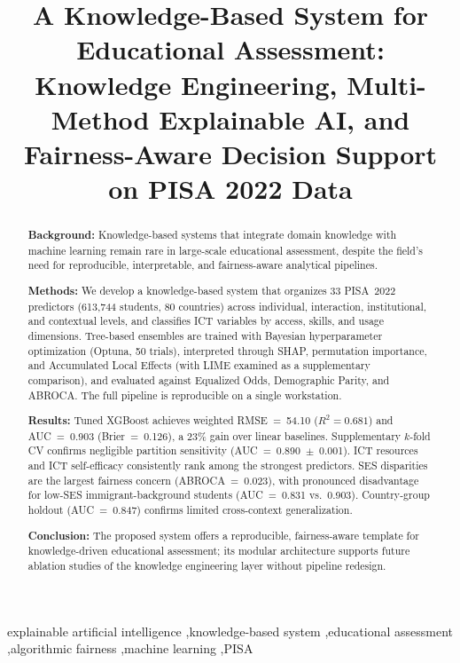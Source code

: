 \documentclass[review,12pt]{elsarticle}
\begin{document}
\begin{frontmatter}

\title{A Knowledge-Based System for Educational Assessment: Knowledge Engineering, Multi-Method Explainable AI, and Fairness-Aware Decision Support on PISA 2022 Data}

\author[aff1]{}
\ead{}
\address[aff1]{}

\begin{abstract}
\setlength{\rightskip}{0pt plus 20pt}

\textbf{Background:} Knowledge-based systems that integrate domain knowledge with machine learning remain rare in large-scale educational assessment, despite the field's need for reproducible, interpretable, and fairness-aware analytical pipelines.

\textbf{Methods:} We develop a knowledge-based system that organizes 33 PISA~2022 predictors (613,744 students, 80 countries) across individual, interaction, institutional, and contextual levels, and classifies ICT variables by access, skills, and usage dimensions. Tree-based ensembles are trained with Bayesian hyperparameter optimization (Optuna, 50 trials), interpreted through SHAP, permutation importance, and Accumulated Local Effects (with LIME examined as a supplementary comparison), and evaluated against Equalized Odds, Demographic Parity, and ABROCA. The full pipeline is reproducible on a single workstation.

\textbf{Results:} Tuned XGBoost achieves weighted RMSE~=~54.10 ($R^2 = 0.681$) and AUC~=~0.903 (Brier~=~0.126), a 23\% gain over linear baselines. Supplementary $k$-fold CV confirms negligible partition sensitivity (AUC~=~0.890~$\pm$~0.001). ICT resources and ICT self-efficacy consistently rank among the strongest predictors. SES disparities are the largest fairness concern (ABROCA~=~0.023), with pronounced disadvantage for low-SES immigrant-background students (AUC~=~0.831 vs.\ 0.903). Country-group holdout (AUC~=~0.847) confirms limited cross-context generalization.

\textbf{Conclusion:} The proposed system offers a reproducible, fairness-aware template for knowledge-driven educational assessment; its modular architecture supports future ablation studies of the knowledge engineering layer without pipeline redesign.

\end{abstract}

\begin{keyword}
explainable artificial intelligence \sep knowledge-based system \sep educational assessment \sep algorithmic fairness \sep machine learning \sep PISA
\end{keyword}

\end{frontmatter}
\end{document}
